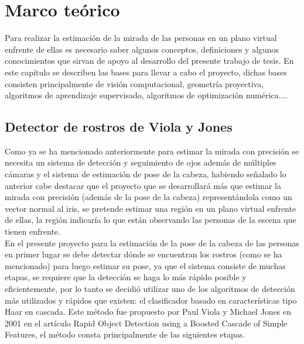 \chapter{Marco teórico}

	Para realizar la estimación de la mirada de las personas en un plano virtual enfrente de ellas es necesario saber algunos conceptos, definiciones y algunos conocimientos que sirvan de apoyo al desarrollo del presente trabajo de tesis. En este capítulo se describen las bases para llevar a cabo el proyecto, dichas bases consisten principalmente de visión computacional, geometría proyectiva, algoritmos de aprendizaje supervisado, algoritmos de optimización numérica....


   
   \section{Detector de rostros de Viola y Jones}
  Como ya se ha mencionado anteriormente para estimar la mirada con precisión se necesita un sistema de detección y seguimiento de ojos además de múltiples cámaras y el sistema de estimación de pose de la cabeza, habiendo señalado lo anterior cabe destacar que el proyecto que se desarrollará más que estimar la mirada con precisión (además de la pose de la cabeza) representándola como un vector normal al iris,  se pretende estimar una región en un plano virtual enfrente de ellas, la región indicaría lo que están observando las personas de la escena que tienen enfrente. \\
   
   En el presente proyecto para la estimación de la pose de la cabeza de las personas en primer lugar se debe detectar dónde se encuentran los rostros (como se ha mencionado) para luego estimar su pose, ya que el sistema consiste de muchas etapas, se requiere que la detección se haga lo más rápido posible y eficientemente,  por lo tanto se decidió utilizar uno de los algoritmos de detección más utilizados y rápidos que existen: el clasificador basado en características tipo Haar en cascada. Este método fue propuesto por Paul Viola y Michael Jones en 2001 en el artículo Rapid Object Detection using a Boosted Cascade of Simple Features, el método consta principalmente de las siguientes etapas.
   
